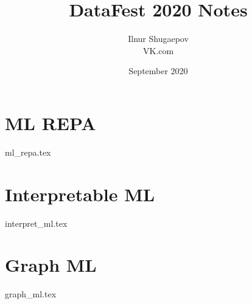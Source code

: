 \documentclass[openany,11pt]{book}
\title{DataFest 2020 Notes}
\author{Ilnur Shugaepov \\ VK.com}
\date{September 2020}
\begin{document}
\maketitle
\setcounter{tocdepth}{1}
\small{\tableofcontents}
\newpage

\newpage
\chapter{ML REPA}
{ml_repa.tex}

\newpage
\chapter{Interpretable ML}
{interpret_ml.tex}

\newpage
\chapter{Graph ML}
{graph_ml.tex}
\end{document}
